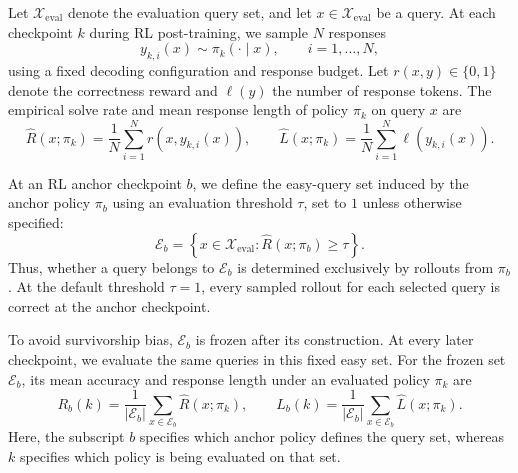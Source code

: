 \documentclass{article} %
\begin{document}
Let $\mathcal{X}_{\mathrm{eval}}$ denote the evaluation query set, and let
$x\in\mathcal{X}_{\mathrm{eval}}$ be a query. At each checkpoint $k$ during RL post-training, we sample $N$ responses
\begin{equation}
  y_{k,i}(x)\sim\pi_k(\cdot\mid x),
  \qquad i=1,\ldots,N,
\end{equation}
using a fixed decoding configuration and response budget. Let
$r(x,y)\in\{0,1\}$ denote the correctness reward and $\ell(y)$ the number of
response tokens. The empirical solve rate and mean response length of policy
$\pi_k$ on query $x$ are
\begin{equation}
  \widehat{R}(x;\pi_k)
  =
  \frac{1}{N}\sum_{i=1}^{N}r\!\left(x,y_{k,i}(x)\right),
  \qquad
  \widehat{L}(x;\pi_k)
  =
  \frac{1}{N}\sum_{i=1}^{N}\ell\!\left(y_{k,i}(x)\right).
  \label{eq:query-statistics}
\end{equation}

At an RL anchor checkpoint $b$, we define the easy-query set induced by the
anchor policy $\pi_b$ using an evaluation threshold $\tau$, set to $1$
unless otherwise specified:
\begin{equation}
  \mathcal{E}_b
  =
  \left\{
    x\in\mathcal{X}_{\mathrm{eval}}:
    \widehat{R}(x;\pi_b)\ge\tau
  \right\}.
  \label{eq:easy-set}
\end{equation}
Thus, whether a query belongs to $\mathcal{E}_b$ is determined exclusively by
rollouts from $\pi_b$. At the default threshold $\tau=1$, every sampled
rollout for each selected query is correct at the anchor checkpoint.

To avoid survivorship bias, $\mathcal{E}_b$ is frozen after its construction. At every later
checkpoint, we evaluate the same queries in this fixed easy set. For the frozen set $\mathcal{E}_b$, its mean accuracy and response length
under an evaluated policy $\pi_k$ are
\begin{equation}
  R_b(k)
  =
  \frac{1}{|\mathcal{E}_b|}
  \sum_{x\in\mathcal{E}_b}
  \widehat{R}(x;\pi_k),
  \qquad
  L_b(k)
  =
  \frac{1}{|\mathcal{E}_b|}
  \sum_{x\in\mathcal{E}_b}
  \widehat{L}(x;\pi_k).
  \label{eq:acc-length}
\end{equation}
Here, the subscript $b$ specifies which anchor policy defines the query
set, whereas $k$ specifies which policy is being evaluated on that set.
\end{document}

